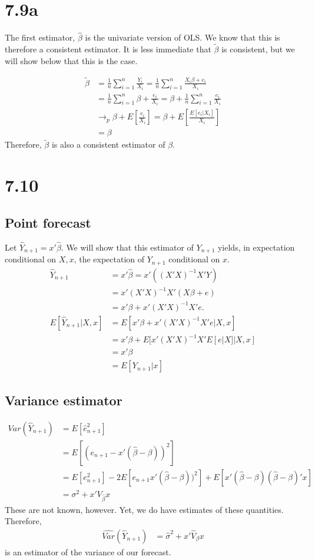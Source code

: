 \documentclass[11pt]{article} %
\begin{document}
\section{7.9a}
The first estimator, $\hat{\beta}$ is the univariate version of OLS. We know that this is therefore a consistent estimator. It is less immediate that $\tilde{\beta}$ is consistent, but we will show below that this is the case.

\begin{align*}
\tilde{\beta} &= \frac{1}{n}\sum_{i=1}^n \frac{Y_i}{X_i} = \frac{1}{n}\sum_{i=1}^n \frac{X_i\beta + e_i}{X_i}\\
&= \frac{1}{n}\sum_{i=1}^n \beta + \frac{e_i}{X_i} =\beta + \frac{1}{n}\sum_{i=1}^n \frac{e_i}{X_i}\\
&\rightarrow_p \beta + E\left[ \frac{e_i}{X_i}\right] =  \beta + E\left[ \frac{E[e_i|X_i]}{X_i}\right]\\
&= \beta
\end{align*}
Therefore, $\tilde{\beta}$ is also a consistent estimator of $\beta$.
\section{7.10}
\subsection{Point forecast}
Let $\hat{Y}_{n+1} = x'\hat{\beta}$. We will show that this estimator of $Y_{n+1}$ yields, in expectation conditional on $X,x$, the expectation of $Y_{n+1}$ conditional on $x$.
\begin{align*}
\hat{Y}_{n+1} &= x'\hat{\beta} = x'((X'X)^{-1}X'Y)\\
&=  x'(X'X)^{-1}X'(X\beta + e)\\
&= x'\beta + x'(X'X)^{-1}X'e.\\
E[\hat{Y}_{n+1}|X,x] &= E[x'\beta + x'(X'X)^{-1}X'e|X,x]\\
&= x'\beta + E[ x'(X'X)^{-1}X'E[e|X]|X,x]\\
&= x'\beta\\
&= E[Y_{n+1}|x]
\end{align*}
\subsection{Variance estimator}
\begin{align*}
Var(\hat{Y}_{n+1}) &= E[\hat{e}_{n+1}^2] \\
&= E[(e_{n+1} - x'(\hat{\beta} - \beta))^2]\\
&= E[e_{n+1}^2] - 2E[e_{n+1}x'(\hat{\beta} - \beta))^2] + E[x'(\hat{\beta} - \beta)(\hat{\beta} - \beta)'x]\\
&= \sigma^2 + x'V_{\hat{\beta}}x
\end{align*}
These are not known, however. Yet, we do have estimates of these quantities. Therefore,
\begin{align*}
\hat{Var}(\hat{Y}_{n+1})  &= \hat{\sigma}^2 + x'\hat{V}_{\beta} x
\end{align*}
is an estimator of the variance of our forecast.
\end{document}
